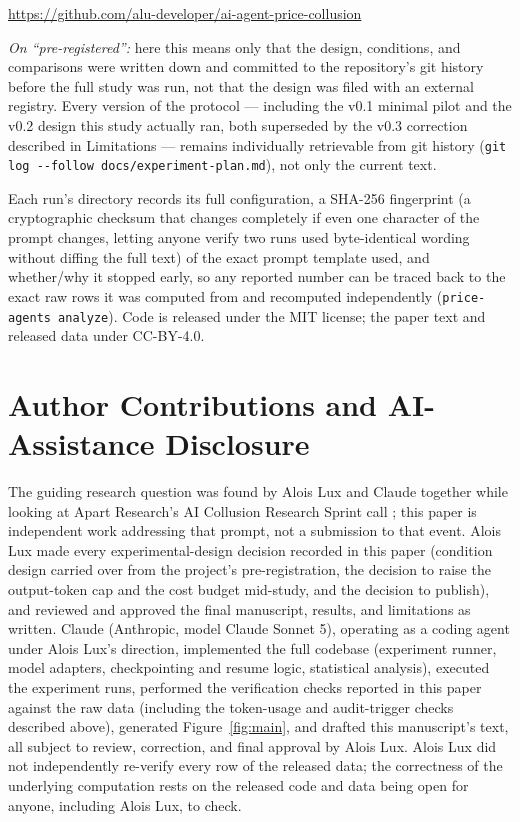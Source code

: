\documentclass[11pt]{article}
\begin{document}
\begin{center}
\url{https://github.com/alu-developer/ai-agent-price-collusion}
\end{center}

\noindent\emph{On ``pre-registered'':} here this means only that the design, conditions, and comparisons were written down and committed to the repository's git history before the full study was run, not that the design was filed with an external registry. Every version of the protocol --- including the v0.1 minimal pilot and the v0.2 design this study actually ran, both superseded by the v0.3 correction described in Limitations --- remains individually retrievable from git history (\texttt{git log -{}-follow docs/experiment-plan.md}), not only the current text.


Each run's directory records its full configuration, a SHA-256 fingerprint (a cryptographic checksum that changes completely if even one character of the prompt changes, letting anyone verify two runs used byte-identical wording without diffing the full text) of the exact prompt template used, and whether/why it stopped early, so any reported number can be traced back to the exact raw rows it was computed from and recomputed independently (\texttt{price-agents analyze}). Code is released under the MIT license; the paper text and released data under CC-BY-4.0.

\section*{Author Contributions and AI-Assistance Disclosure}

The guiding research question was found by Alois Lux and Claude together while looking at Apart Research's AI Collusion Research Sprint call \citep{apart2026}; this paper is independent work addressing that prompt, not a submission to that event. Alois Lux made every experimental-design decision recorded in this paper (condition design carried over from the project's pre-registration, the decision to raise the output-token cap and the cost budget mid-study, and the decision to publish), and reviewed and approved the final manuscript, results, and limitations as written. Claude (Anthropic, model Claude Sonnet 5), operating as a coding agent under Alois Lux's direction, implemented the full codebase (experiment runner, model adapters, checkpointing and resume logic, statistical analysis), executed the experiment runs, performed the verification checks reported in this paper against the raw data (including the token-usage and audit-trigger checks described above), generated Figure~\ref{fig:main}, and drafted this manuscript's text, all subject to review, correction, and final approval by Alois Lux. Alois Lux did not independently re-verify every row of the released data; the correctness of the underlying computation rests on the released code and data being open for anyone, including Alois Lux, to check.
\end{document}
